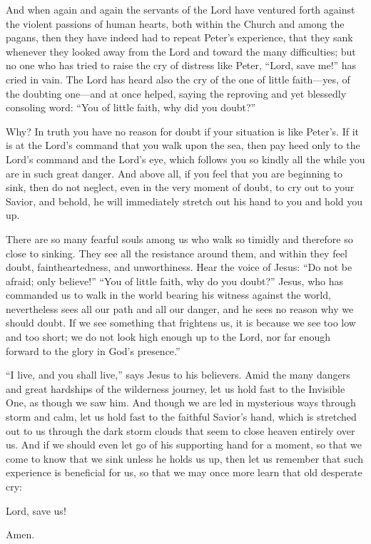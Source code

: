 And when again and again the servants of the Lord have ventured forth against the violent passions of human hearts, both within the Church and among the pagans, then they have indeed had to repeat Peter’s experience, that they sank whenever they looked away from the Lord and toward the many difficulties; but no one who has tried to raise the cry of distress like Peter, “Lord, save me!” has cried in vain. The Lord has heard also the cry of the one of little faith—yes, of the doubting one—and at once helped, saying the reproving and yet blessedly consoling word: “You of little faith, why did you doubt?”

Why? In truth you have no reason for doubt if your situation is like Peter’s. If it is at the Lord’s command that you walk upon the sea, then pay heed only to the Lord’s command and the Lord’s eye, which follows you so kindly all the while you are in such great danger. And above all, if you feel that you are beginning to sink, then do not neglect, even in the very moment of doubt, to cry out to your Savior, and behold, he will immediately stretch out his hand to you and hold you up.

There are so many fearful souls among us who walk so timidly and therefore so close to sinking. They see all the resistance around them, and within they feel doubt, faintheartedness, and unworthiness. Hear the voice of Jesus: “Do not be afraid; only believe!” “You of little faith, why do you doubt?” Jesus, who has commanded us to walk in the world bearing his witness against the world, nevertheless sees all our path and all our danger, and he sees no reason why we should doubt. If we see something that frightens us, it is because we see too low and too short; we do not look high enough up to the Lord, nor far enough forward to the glory in God’s presence.”

“I live, and you shall live,” says Jesus to his believers. Amid the many dangers and great hardships of the wilderness journey, let us hold fast to the Invisible One, as though we saw him. And though we are led in mysterious ways through storm and calm, let us hold fast to the faithful Savior’s hand, which is stretched out to us through the dark storm clouds that seem to close heaven entirely over us. And if we should even let go of his supporting hand for a moment, so that we come to know that we sink unless he holds us up, then let us remember that such experience is beneficial for us, so that we may once more learn that old desperate cry:

Lord, save us!

Amen.


